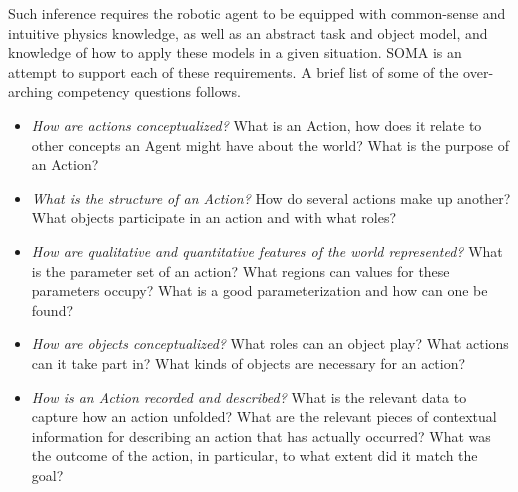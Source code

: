 Such inference requires the robotic agent to be equipped with common-sense and intuitive physics knowledge, as well as an abstract task and object model, and knowledge of how to apply these models in a given situation. SOMA is an attempt to support each of these requirements. A brief list of some of the over-arching competency questions follows.


\begin{itemize}
    \item \emph{How are actions conceptualized?} What is an Action, how does it relate to other concepts an Agent might have about the world? What is the purpose of an Action?
    \item \emph{What is the structure of an Action?} How do several actions make up another? What objects participate in an action and with what roles?
    \item \emph{How are qualitative and quantitative features of the world represented?} What is the parameter set of an action? What regions can values for these parameters occupy? What is a good parameterization and how can one be found?
    \item \emph{How are objects conceptualized?} What roles can an object play? What actions can it take part in? What kinds of objects are necessary for an action?
    \item \emph{How is an Action recorded and described?} What is the relevant data to capture how an action unfolded? What are the relevant pieces of contextual information for describing an action that has actually occurred? What was the outcome of the action, in particular, to what extent did it match the goal?
\end{itemize}

